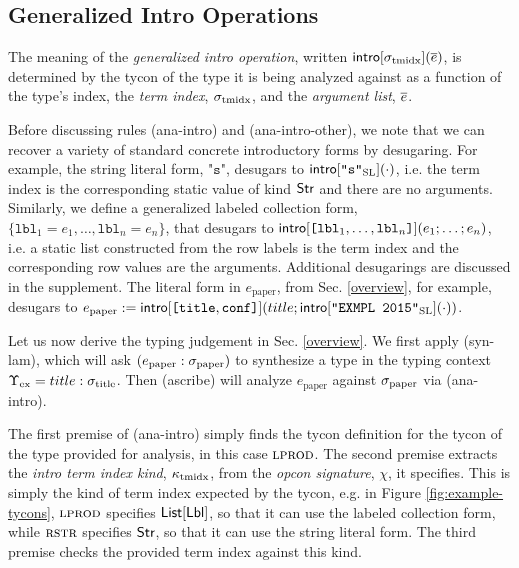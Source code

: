 \documentclass[preprint]{sigplanconf}
\begin{document}
\subsection{Generalized Intro Operations}\label{sec:introop}
\noindent The meaning of the \emph{generalized intro operation}, written $\small\eintro{\sttmidx}{\es}$, is determined by the tycon of the type it is being analyzed against as a function of the type's index, the \emph{term index}, $\sigma_\text{tmidx}$, and the \emph{argument list}, $\overline{e}$.

Before discussing rules (ana-intro) and (ana-intro-other), we note that we can recover a variety of standard concrete introductory forms by desugaring. For example, the string literal form, $\texttt{"s"}$, desugars to ${\sf intro}[\texttt{"s"}_\text{SL}](\cdot)$, i.e. the term index is the corresponding static value of kind ${\sf Str}$ and there are no arguments. Similarly, we define a generalized labeled collection form, $\{\mathtt{lbl}_1=e_1, \ldots, \mathtt{lbl}_n=e_n\}$, that desugars to ${\sf intro}[\texttt{[}\mathtt{lbl}_1, \ldots, \mathtt{lbl}_n\texttt{]}](e_1; \ldots; e_n)$, i.e. a static list constructed from the row labels is the term index and the corresponding row values are the arguments. Additional desugarings are discussed in the supplement. The literal form in $e_\text{paper}$, from Sec. \ref{overview}, for example, desugars to $e_\text{paper}:={\sf intro}[\texttt{[}\texttt{title}, \texttt{conf}\texttt{]}](title; {\sf intro}[\texttt{"EXMPL 2015"}_\text{SL}](\cdot))$. %

Let us now derive the typing judgement in Sec. \ref{overview}. We first apply (syn-lam), which will ask $(e_\text{paper} : \sigma_\text{paper})$ to synthesize a type in the typing context $\Upsilon_\text{ex}=title : \sigma_\text{title}$. Then (ascribe) will analyze $e_\text{paper}$ against $\sigma_\text{paper}$ via (ana-intro). 

The first premise of (ana-intro) simply finds the tycon definition for the tycon of the type provided for analysis, in this case $\textsc{lprod}$. %
The second premise extracts the \emph{intro term index kind}, $\kappa_\text{tmidx}$, from the \emph{opcon signature}, $\chi$, it specifies. This is simply the kind of term index expected by the tycon, e.g. in Figure \ref{fig:example-tycons}, $\textsc{lprod}$ specifies ${\sf List}[{\sf Lbl}]$, so that it can use the labeled collection form, while $\textsc{rstr}$ specifies  ${\sf Str}$, so that it can use the string literal form. The third premise checks the provided term index against this kind.  %
\end{document}
